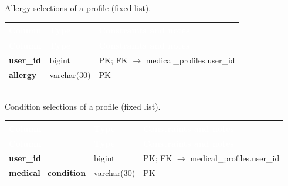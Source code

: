 \subsection*{}
Allergy selections of a profile (fixed list).\par\vspace{2pt}
{\tabfont\rowband
\begin{longtable}{@{}>{\raggedright\arraybackslash}p{}>{\raggedright\arraybackslash}p{}>{\raggedright\arraybackslash}p{}@{}}
\rowcolor{najdanavy}\textcolor{white}{\sffamily\bfseries\small Column} & \textcolor{white}{\sffamily\bfseries\small Type} & \textcolor{white}{\sffamily\bfseries\small Constraints and notes}\\
\endfirsthead
\rowcolor{najdanavy}\textcolor{white}{\sffamily\bfseries\small Column} & \textcolor{white}{\sffamily\bfseries\small Type} & \textcolor{white}{\sffamily\bfseries\small Constraints and notes}\\
\endhead
\bottomrule\endlastfoot
\textbf{user\_\allowbreak{}id} & bigint & PK; FK $\rightarrow$ medical\_\allowbreak{}profiles.user\_\allowbreak{}id\\
\textbf{allergy} & varchar(30) & PK\\
\end{longtable}}

\subsection*{}
Condition selections of a profile (fixed list).\par\vspace{2pt}
{\tabfont\rowband
\begin{longtable}{@{}>{\raggedright\arraybackslash}p{}>{\raggedright\arraybackslash}p{}>{\raggedright\arraybackslash}p{}@{}}
\rowcolor{najdanavy}\textcolor{white}{\sffamily\bfseries\small Column} & \textcolor{white}{\sffamily\bfseries\small Type} & \textcolor{white}{\sffamily\bfseries\small Constraints and notes}\\
\endfirsthead
\rowcolor{najdanavy}\textcolor{white}{\sffamily\bfseries\small Column} & \textcolor{white}{\sffamily\bfseries\small Type} & \textcolor{white}{\sffamily\bfseries\small Constraints and notes}\\
\endhead
\bottomrule\endlastfoot
\textbf{user\_\allowbreak{}id} & bigint & PK; FK $\rightarrow$ medical\_\allowbreak{}profiles.user\_\allowbreak{}id\\
\textbf{medical\_\allowbreak{}condition} & varchar(30) & PK\\
\end{longtable}}

